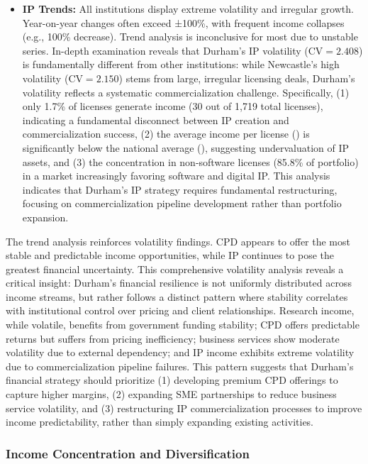 \documentclass[journal,onecolumn, 10pt,draftclsnofoot]{IEEEtran}
\begin{document}
\begin{itemize}
    \item \textbf{IP Trends:} All institutions display extreme volatility and irregular growth. Year-on-year changes often exceed ±100\%, with frequent income collapses (e.g., 100\% decrease). Trend analysis is inconclusive for most due to unstable series. In-depth examination reveals that Durham's IP volatility ($\mathrm{CV}=2.408$) is fundamentally different from other institutions: while Newcastle's high volatility ($\mathrm{CV}=2.150$) stems from large, irregular licensing deals, Durham's volatility reflects a systematic commercialization challenge. Specifically, (1) only 1.7\% of licenses generate income (30 out of 1,719 total licenses), indicating a fundamental disconnect between IP creation and commercialization success, (2) the average income per license () is significantly below the national average (), suggesting undervaluation of IP assets, and (3) the concentration in non-software licenses (85.8\% of portfolio) in a market increasingly favoring software and digital IP. This analysis indicates that Durham's IP strategy requires fundamental restructuring, focusing on commercialization pipeline development rather than portfolio expansion.
\end{itemize}

The trend analysis reinforces volatility findings. CPD appears to offer the most stable and predictable income opportunities, while IP continues to pose the greatest financial uncertainty. This comprehensive volatility analysis reveals a critical insight: Durham's financial resilience is not uniformly distributed across income streams, but rather follows a distinct pattern where stability correlates with institutional control over pricing and client relationships. Research income, while volatile, benefits from government funding stability; CPD offers predictable returns but suffers from pricing inefficiency; business services show moderate volatility due to external dependency; and IP income exhibits extreme volatility due to commercialization pipeline failures. This pattern suggests that Durham's financial strategy should prioritize (1) developing premium CPD offerings to capture higher margins, (2) expanding SME partnerships to reduce business service volatility, and (3) restructuring IP commercialization processes to improve income predictability, rather than simply expanding existing activities.

\subsubsection{Income Concentration and Diversification}
\end{document}
